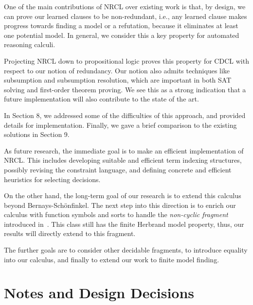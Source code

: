 \documentclass[a4paper]{article}
\newcommand{\mEPR}{Bernays-Sch\"onfinkel}
\begin{document}
One of the main contributions of NRCL over existing work is that, by design, 
we can prove our learned clauses to be non-redundant, i.e., any learned clause makes progress 
towards finding a model or a refutation, because it eliminates at least one potential model. 
In general, we consider this a key property for automated reasoning calculi.

Projecting NRCL down to propositional logic proves this property for CDCL 
with respect to our notion of redundancy. 
Our notion also admits techniques like subsumption and subsumption resolution, 
which are important in both SAT solving and first-order theorem proving. 
We see this as a strong indication that a future implementation 
will also contribute to the state of the art.

In Section 8, we addressed some of the difficulties of this approach, and provided 
details for implementation.
Finally, we gave a brief comparison to the existing solutions in Section 9.

As future research, the immediate goal is to 
make an efficient implementation of NRCL.
This includes developing suitable and efficient term indexing structures, possibly revising the constraint language, and 
defining concrete and efficient heuristics for selecting decisions.

On the other hand, the long-term goal of our research is to extend this calculus beyond {\mEPR}.
The next step into this direction is to enrich our calculus with function symbols and sorts to handle the
\emph{non-cyclic fragment} introduced in~\cite{Noncyclic13}. 
This class still has the finite Herbrand model property, thus, our results will directly extend to this fragment.

The further goals are to consider other decidable fragments, to introduce equality into our calculus, and finally 
to extend our work to finite model finding.
% 

\ifdefined\PRINTNOTES
\section{Notes and Design Decisions}
\end{document}

